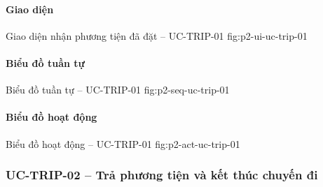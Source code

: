 \par\medskip
\noindent\begin{minipage}{\linewidth}
\paragraph{Giao diện}
  {Giao diện nhận phương tiện đã đặt -- UC-TRIP-01}
  {fig:p2-ui-uc-trip-01}
  {}
\end{minipage}\par

\clearpage
\paragraph{Biểu đồ tuần tự}
  {Biểu đồ tuần tự -- UC-TRIP-01}
  {fig:p2-seq-uc-trip-01}

\clearpage
\paragraph{Biểu đồ hoạt động}
  {Biểu đồ hoạt động -- UC-TRIP-01}
  {fig:p2-act-uc-trip-01}

\clearpage

\subsubsection{UC-TRIP-02 -- Trả phương tiện và kết thúc chuyến đi}


